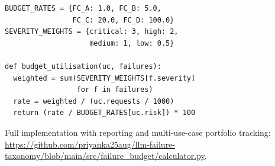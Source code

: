 \documentclass{article}
\begin{document}
\begin{minipage}{\columnwidth}
\begin{Verbatim}[fontsize=\small]
BUDGET_RATES = {FC_A: 1.0, FC_B: 5.0,
                FC_C: 20.0, FC_D: 100.0}
SEVERITY_WEIGHTS = {critical: 3, high: 2,
                    medium: 1, low: 0.5}

def budget_utilisation(uc, failures):
  weighted = sum(SEVERITY_WEIGHTS[f.severity]
                 for f in failures)
  rate = weighted / (uc.requests / 1000)
  return (rate / BUDGET_RATES[uc.risk]) * 100
\end{Verbatim}
\end{minipage}

\vspace{0.5em}
Full implementation with reporting and multi-use-case portfolio tracking:
{\small\url{https://github.com/priyanka25aug/llm-failure-taxonomy/blob/main/src/failure_budget/calculator.py}}.
\end{document}
